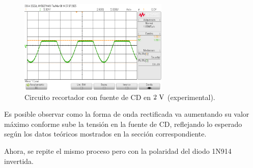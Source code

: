 \documentclass[journal]{IEEEtran}
\begin{document}
\begin{figure}[H]
        \centering
        \includegraphics[width=2.8in]{SignalExperimental_10.png}
        \caption{Circuito recortador con fuente de CD en $2~\textnormal{V}$ (experimental).}
        \label{fig:SignalExperimental_10}
\end{figure}

Es posible observar como la forma de onda rectificada va aumentando su valor máximo conforme sube la tensión en la fuente de CD,
reflejando lo esperado según los datos teóricos mostrados en la sección correspondiente. 

Ahora, se repite el mismo proceso pero con la polaridad del diodo 1N914 invertida. 
\end{document}
